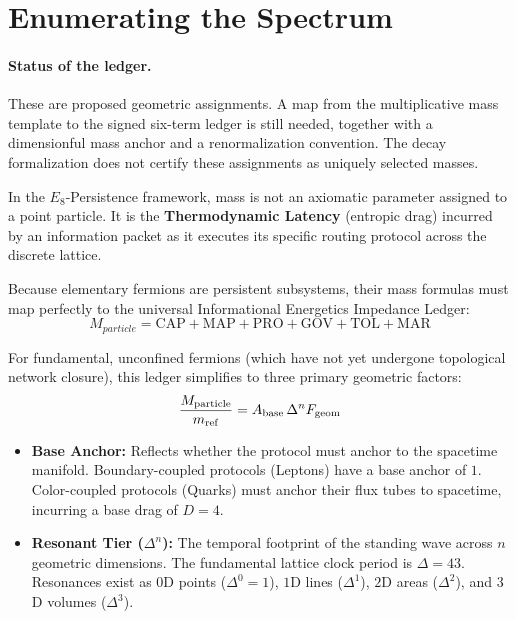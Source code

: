 \section{Enumerating the Spectrum}
\label{sec:mass_ledger}
\paragraph{Status of the ledger.} These are proposed geometric assignments. A map from the multiplicative mass template to the signed six-term ledger is still needed, together with a dimensionful mass anchor and a renormalization convention. The decay formalization does not certify these assignments as uniquely selected masses.


In the $E_8$-Persistence framework, mass is not an axiomatic parameter assigned to a point particle. It is the \textbf{Thermodynamic Latency} (entropic drag) incurred by an information packet as it executes its specific routing protocol across the discrete lattice. 

Because elementary fermions are persistent subsystems, their mass formulas must map perfectly to the universal Informational Energetics Impedance Ledger: 
\begin{equation}
    M_{particle} = \text{CAP} + \text{MAP} + \text{PRO} + \text{GOV} + \text{TOL} + \text{MAR}
\end{equation}

For fundamental, unconfined fermions (which have not yet undergone topological network closure), this ledger simplifies to three primary geometric factors:
\begin{equation}
    \frac{M_{\rm particle}}{m_{\rm ref}}=A_{\rm base}\,\Delta^n F_{\rm geom}
\end{equation}

\begin{itemize}
    \item \textbf{Base Anchor:} Reflects whether the protocol must anchor to the spacetime manifold. Boundary-coupled protocols (Leptons) have a base anchor of $1$. Color-coupled protocols (Quarks) must anchor their flux tubes to spacetime, incurring a base drag of $D=4$.
    \item \textbf{Resonant Tier ($\Delta^n$):} The temporal footprint of the standing wave across $n$ geometric dimensions. The fundamental lattice clock period is $\Delta=43$. Resonances exist as $0$D points ($\Delta^0=1$), $1$D lines ($\Delta^1$), $2$D areas ($\Delta^2$), and $3$D volumes ($\Delta^3$). 
\end{itemize}


